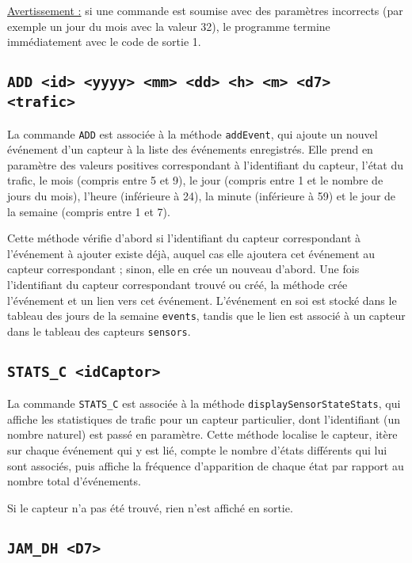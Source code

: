 \documentclass[11pt,a4paper]{article}
\begin{document}
\underline{Avertissement :} si une commande est soumise avec des paramètres incorrects (par exemple un jour du mois avec la valeur 32), le programme termine immédiatement avec le code de sortie 1.

\subsection{\texttt{ADD <id> <yyyy> <mm> <dd> <h> <m> <d7> <trafic>}}
\label{subsec:ADD}

La commande \texttt{ADD} est associée à la méthode \texttt{addEvent}, qui ajoute un nouvel événement d'un capteur à la liste des événements enregistrés. Elle prend en paramètre des valeurs positives correspondant à l'identifiant du capteur, l'état du trafic, le mois (compris entre 5 et 9), le jour (compris entre 1 et le nombre de jours du mois), l'heure (inférieure à 24), la minute (inférieure à 59) et le jour de la semaine (compris entre 1 et 7).

Cette méthode vérifie d'abord si l'identifiant du capteur correspondant à l'événement à ajouter existe déjà, auquel cas elle ajoutera cet événement au capteur correspondant ; sinon, elle en crée un nouveau d'abord. Une fois l'identifiant du capteur correspondant trouvé ou créé, la méthode crée l'événement et un lien vers cet événement. L'événement en soi est stocké dans le tableau des jours de la semaine \texttt{events}, tandis que le lien est associé à un capteur dans le tableau des capteurs \texttt{sensors}.

\subsection{\texttt{STATS\_C <idCaptor>}}
\label{subsec:STATS_C}

La commande \texttt{STATS\_C} est associée à la méthode \texttt{displaySensorStateStats}, qui affiche les statistiques de trafic pour un capteur particulier, dont l'identifiant (un nombre naturel) est passé en paramètre.
Cette méthode localise le capteur, itère sur chaque événement qui y est lié, compte le nombre d'états différents qui lui sont associés, puis affiche la fréquence d'apparition de chaque état par rapport au nombre total d'événements.

Si le capteur n'a pas été trouvé, rien n'est affiché en sortie.

\subsection{\texttt{JAM\_DH <D7>}}
\label{subsec:JAM_DH}
\end{document}
